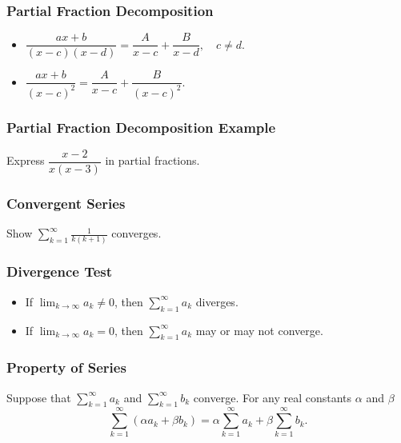 \documentclass{beamer}
\begin{document}
  \begin{frame}
  \frametitle{Partial Fraction Decomposition}
\begin{itemize}
\item $\dfrac{a x + b}{(x - c)(x - d)} = \dfrac{A}{x - c} + \dfrac{B}{x - d},\quad c \neq d.$
\item $\dfrac{ax + b}{(x - c)^2} = \dfrac{A}{x - c} + \dfrac{B}{(x - c)^2}.$
\end{itemize}
  \end{frame}
  
 \begin{frame}[t]
 \frametitle{Partial Fraction Decomposition Example}
 \begin{Example}
 Express $\dfrac{x - 2}{x(x - 3)}$ in partial fractions.
 \end{Example}

  \end{frame}
  
  \begin{frame}[t]
   \frametitle{Convergent Series}
   \begin{Example}
   Show $\displaystyle\sum_{k = 1}^\infty \frac{1}{k(k + 1)}$ converges. 
   \end{Example}
  
  \end{frame}
 
 \begin{frame}
 \frametitle{Divergence Test}
 \begin{itemize}
\item If $\displaystyle\lim_{k\to\infty} a_k \neq 0$, then $\displaystyle\sum_{k = 1}^\infty a_k$ diverges.  
\item If $\displaystyle\lim_{k\to\infty} a_k =  0$, then $\displaystyle\sum_{k = 1}^\infty a_k$ may or may not converge.
\end{itemize}
 \end{frame}
 
 \begin{frame}
 \frametitle{Property of Series}
 
 \begin{Theorem} 
 Suppose that $\displaystyle\sum_{k = 1}^\infty a_k$ and $\displaystyle\sum_{k = 1}^\infty b_k$ converge. For any real constants $\alpha$ and $\beta$
 $$
 \sum_{k = 1}^\infty\left( \alpha a_k + \beta b_k\right) =   \alpha \sum_{k = 1}^\infty a_k + \beta \sum_{k = 1}^\infty b_k .
 $$
  \end{Theorem} 
 \end{frame}
 
\end{document}
